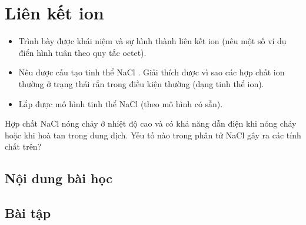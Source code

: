 \section{Liên kết ion}
\begin{Muctieu}
	\begin{itemize}
		\item Trình bày được khái niệm và sự hình thành liên kết ion (nêu một số ví dụ điển hình tuân theo quy tắc octet).
		\item Nêu được cấu tạo tinh thể NaCl . Giải thích được vì sao các hợp chất ion thường ở trạng thái rắn trong điều kiện thường (dạng tinh thể ion).
		\item Lắp được mô hình tinh thể NaCl (theo mô hình có sẵn).
	\end{itemize}
\end{Muctieu}
\begin{kd}
	Hợp chất NaCl nóng chảy ở nhiệt độ cao và có khả năng dẫn điện khi nóng chảy hoặc khi hoà tan trong dung dịch. Yếu tố nào trong phân tử NaCl gây ra các tính chất trên?
\end{kd}
\subsection{Nội dung bài học}

\subsection{Bài tập}

